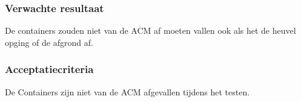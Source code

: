 \subsubsection{Verwachte resultaat}
\begin{flushleft}
    De containers zouden niet van de ACM af moeten vallen ook als het de heuvel opging of de afgrond af.
\end{flushleft}
\subsubsection{Acceptatiecriteria}
\begin{flushleft}
    De Containers zijn niet van de ACM afgevallen tijdens het testen.
\end{flushleft}